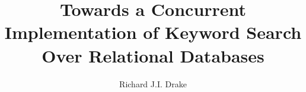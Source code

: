 \documentclass[grad]{uoit-thesis}
\author{Richard J.I. Drake}
\title{Towards a Concurrent Implementation of Keyword Search Over Relational Databases}
\begin{document}
	
	
	
	\begin{preliminary}
		\maketitle

		\setcounter{page}{3}

		\tableofcontents

		\listoftables
		\listoffigures
		\listofalgorithms
		\printglossaries
	\end{preliminary}
	
	
	
	
	
	
	
	
	
	
	
	

	\appendix
	
	\begin{singlespaced}
		
	\end{singlespaced}
	
	
	
	\printbibliography
	
	
	\todos
\end{document}
